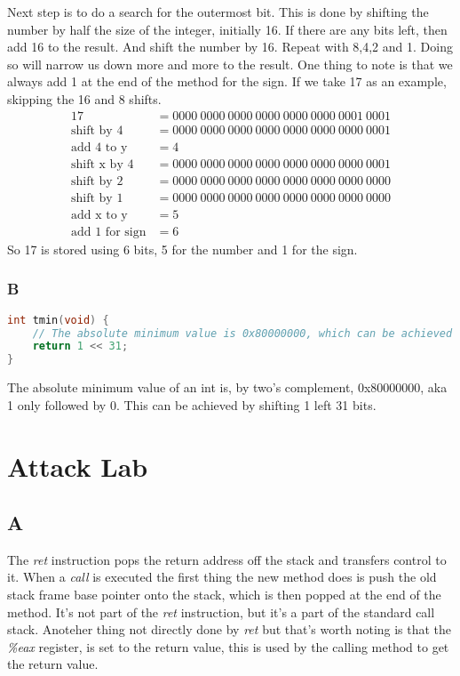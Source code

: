 \documentclass[11pt]{report}
\begin{document}
Next step is to do a search for the outermost bit. This is done by shifting the number by half the size of the integer, initially 16. If there are any bits left, then add 16 to the result. And shift the number by 16. Repeat with 8,4,2 and 1. Doing so will narrow us down more and more to the result. One thing to note is that we always add 1 at the end of the method for the sign. If we take 17 as an example, skipping the 16 and 8 shifts. 
\begin{align*}
    17 &= 0000\ 0000\ 0000\ 0000\ 0000\ 0000\ 0001\ 0001\\
    \text{shift by 4} &= 0000\ 0000\ 0000\ 0000\ 0000\ 0000\ 0000\ 0001\\
    \text{add 4 to y} &= 4\\
    \text{shift x by 4} &= 0000\ 0000\ 0000\ 0000\ 0000\ 0000\ 0000\ 0001\\
    \text{shift by 2} &= 0000\ 0000\ 0000\ 0000\ 0000\ 0000\ 0000\ 0000\\
    \text{shift by 1} &= 0000\ 0000\ 0000\ 0000\ 0000\ 0000\ 0000\ 0000\\
    \text{add x to y} &= 5\\
    \text{add 1 for sign} &= 6
\end{align*}
So 17 is stored using 6 bits, 5 for the number and 1 for the sign.

\subsection{B}
\begin{lstlisting}[language=C]
int tmin(void) {
    // The absolute minimum value is 0x80000000, which can be achieved by shifting 1 left 31 bits.
    return 1 << 31;
}
\end{lstlisting}

The absolute minimum value of an int is, by two's complement, 0x80000000, aka 1 only followed by 0. This can be achieved by shifting 1 left 31 bits.


\chapter{Attack Lab}
\section{A}
The \textit{ret} instruction pops the return address off the stack and transfers control to it. When a \textit{call} is executed the first thing the new method does is push the old stack frame base pointer onto the stack, which is then popped at the end of the method. It's not part of the \textit{ret} instruction, but it's a part of the standard call stack. Anoteher thing not directly done by \textit{ret} but that's worth noting is that the \textit{\%eax} register, is set to the return value, this is used by the calling method to get the return value.
\end{document}
